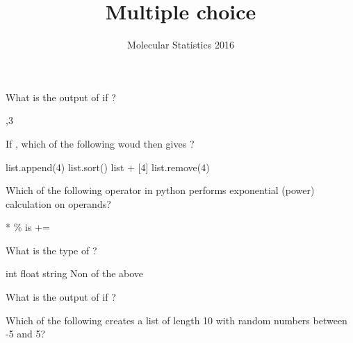 \documentclass{exam}
\title{Multiple choice}
\author{Molecular Statistics 2016}
\date{}
\begin{document}
\maketitle

\begin{center}
\end{center}
\vspace{0.1in}
\vspace{0.2in}


\begin{questions}
\question What is the output of  if ?
\begin{checkboxes}
,3
\end{checkboxes}
\vspace{1cm}

\question If , which of the following woud then gives ?
\begin{checkboxes}
\CorrectChoice list.append(4)
\choice list.sort()
\choice list + [4]
\choice list.remove(4)
\end{checkboxes}
\vspace{1cm}


\question Which of the following operator in python performs exponential (power) calculation on operands?
\begin{checkboxes}
\CorrectChoice **
\choice \%
\choice is
\choice +=
\end{checkboxes}
\vspace{1cm}


\question What is the type of ?
\begin{checkboxes}
\choice int
\CorrectChoice float
\choice string
\choice Non of the above
\end{checkboxes}
\vspace{1cm}

\newpage
\question What is the output of  if ?
\begin{checkboxes}
\choice [1, 4, 9, 16]
\choice [2, 4, 6, 8]
\CorrectChoice [0, 1, 4, 9]
\choice [0, 2, 4, 6]
\end{checkboxes}
\vspace{1cm}


\question Which of the following creates a list of length 10 with random numbers between -5 and 5?
\begin{checkboxes}
\choice {}
\choice {}
\choice {}
\choice {}
\end{checkboxes}
\vspace{1cm}


\end{questions}
\end{document}
